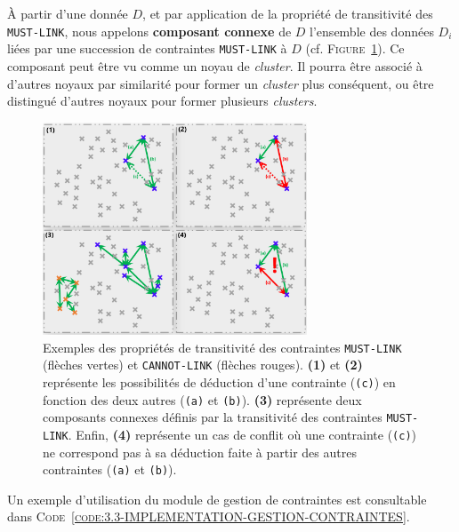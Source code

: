 		À partir d'une donnée \(D\), et par application de la propriété de transitivité des \texttt{MUST-LINK}, nous appelons \textbf{composant connexe} de \(D\) l'ensemble des données \(D_i\) liées par une succession de contraintes \texttt{MUST-LINK} à \(D\) (cf. \textsc{Figure~\ref{figure:3.3-CONTRAINTES-TRANSITIVITE}}).
		Ce composant peut être vu comme un noyau de \textit{cluster}.
		Il pourra être associé à d'autres noyaux par similarité pour former un \textit{cluster} plus conséquent, ou être distingué d'autres noyaux pour former plusieurs \textit{clusters}.

		\begin{figure}[!htb]
			\centering
			\includegraphics[width=0.70\textwidth]{figures/example-constraints-transitivity}
			\caption{
				Exemples des propriétés de transitivité des contraintes \texttt{MUST-LINK} (flèches vertes) et \texttt{CANNOT-LINK} (flèches rouges). \textbf{(1)} et \textbf{(2)} représente les possibilités de déduction d'une contrainte (\texttt{(c)}) en fonction des deux autres (\texttt{(a)} et \texttt{(b)}). \textbf{(3)} représente deux composants connexes définis par la transitivité des contraintes \texttt{MUST-LINK}. Enfin, \textbf{(4)} représente un cas de conflit où une contrainte (\texttt{(c)}) ne correspond pas à sa déduction faite à partir des autres contraintes (\texttt{(a)} et \texttt{(b)}).
			}
			\label{figure:3.3-CONTRAINTES-TRANSITIVITE}
		\end{figure}
		
		Un exemple d'utilisation du module de gestion de contraintes est consultable dans \textsc{Code~\ref{code:3.3-IMPLEMENTATION-GESTION-CONTRAINTES}}.
		
